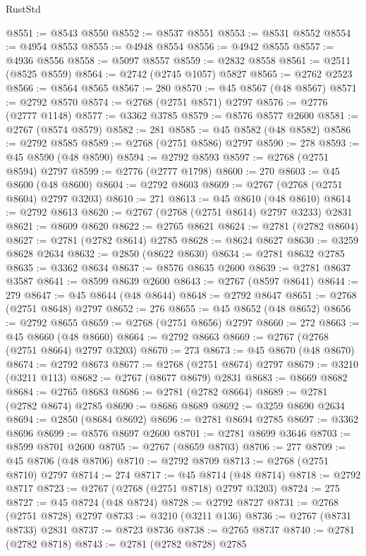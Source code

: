 \begin{lexlean}{RustStd}
\begin{coremodule}
@8551 := @8543 @8550
@8552 := @8537 @8551
@8553 := @8531 @8552
@8554 := @4954 @8553
@8555 := @4948 @8554
@8556 := @4942 @8555
@8557 := @4936 @8556
@8558 := @5097 @8557
@8559 := @2832 @8558
@8561 := @2511 (@8525 @8559)
@8564 := @2742 (@2745 @1057) @5827
@8565 := @2762 @2523
@8566 := @8564 @8565
@8567 := 280
@8570 := @45 @8567 (@48 @8567)
@8571 := @2792 @8570
@8574 := @2768 (@2751 @8571) @2797
@8576 := @2776 (@2777 @1148)
@8577 := @3362 @3785
@8579 := @8576 @8577 @2600
@8581 := @2767 (@8574 @8579)
@8582 := 281
@8585 := @45 @8582 (@48 @8582)
@8586 := @2792 @8585
@8589 := @2768 (@2751 @8586) @2797
@8590 := 278
@8593 := @45 @8590 (@48 @8590)
@8594 := @2792 @8593
@8597 := @2768 (@2751 @8594) @2797
@8599 := @2776 (@2777 @1798)
@8600 := 270
@8603 := @45 @8600 (@48 @8600)
@8604 := @2792 @8603
@8609 := @2767 (@2768 (@2751 @8604) @2797 @3203)
@8610 := 271
@8613 := @45 @8610 (@48 @8610)
@8614 := @2792 @8613
@8620 := @2767 (@2768 (@2751 @8614) @2797 @3233) @2831
@8621 := @8609 @8620
@8622 := @2765 @8621
@8624 := @2781 (@2782 @8604)
@8627 := @2781 (@2782 @8614) @2785
@8628 := @8624 @8627
@8630 := @3259 @8628 @2634
@8632 := @2850 (@8622 @8630)
@8634 := @2781 @8632 @2785
@8635 := @3362 @8634
@8637 := @8576 @8635 @2600
@8639 := @2781 @8637 @3587
@8641 := @8599 @8639 @2600
@8643 := @2767 (@8597 @8641)
@8644 := 279
@8647 := @45 @8644 (@48 @8644)
@8648 := @2792 @8647
@8651 := @2768 (@2751 @8648) @2797
@8652 := 276
@8655 := @45 @8652 (@48 @8652)
@8656 := @2792 @8655
@8659 := @2768 (@2751 @8656) @2797
@8660 := 272
@8663 := @45 @8660 (@48 @8660)
@8664 := @2792 @8663
@8669 := @2767 (@2768 (@2751 @8664) @2797 @3203)
@8670 := 273
@8673 := @45 @8670 (@48 @8670)
@8674 := @2792 @8673
@8677 := @2768 (@2751 @8674) @2797
@8679 := @3210 (@3211 @113)
@8682 := @2767 (@8677 @8679) @2831
@8683 := @8669 @8682
@8684 := @2765 @8683
@8686 := @2781 (@2782 @8664)
@8689 := @2781 (@2782 @8674) @2785
@8690 := @8686 @8689
@8692 := @3259 @8690 @2634
@8694 := @2850 (@8684 @8692)
@8696 := @2781 @8694 @2785
@8697 := @3362 @8696
@8699 := @8576 @8697 @2600
@8701 := @2781 @8699 @3646
@8703 := @8599 @8701 @2600
@8705 := @2767 (@8659 @8703)
@8706 := 277
@8709 := @45 @8706 (@48 @8706)
@8710 := @2792 @8709
@8713 := @2768 (@2751 @8710) @2797
@8714 := 274
@8717 := @45 @8714 (@48 @8714)
@8718 := @2792 @8717
@8723 := @2767 (@2768 (@2751 @8718) @2797 @3203)
@8724 := 275
@8727 := @45 @8724 (@48 @8724)
@8728 := @2792 @8727
@8731 := @2768 (@2751 @8728) @2797
@8733 := @3210 (@3211 @136)
@8736 := @2767 (@8731 @8733) @2831
@8737 := @8723 @8736
@8738 := @2765 @8737
@8740 := @2781 (@2782 @8718)
@8743 := @2781 (@2782 @8728) @2785

\end{coremodule}
\end{lexlean}
